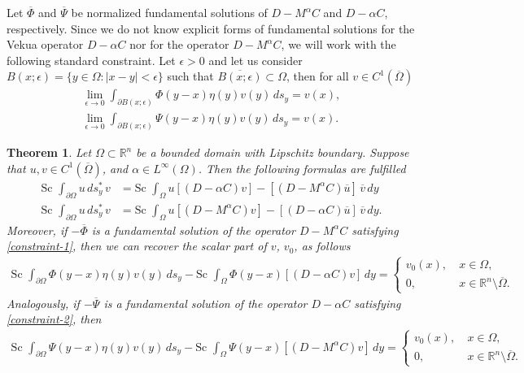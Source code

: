 \documentclass[12pt]{article}
\newtheorem{theorem}{Theorem}
\def\R{\mathbb{R}}
\def\Sc{\mbox{Sc}\,}
\begin{document}
Let $\overline{\Phi}$ and $\overline{\Psi}$ be normalized fundamental solutions of $D-M^{\alpha}C$ and $D-\alpha C$, respectively. Since we do not know explicit forms of fundamental solutions for the Vekua operator $D-\alpha C$ nor for the operator $D-M^{\alpha}C$, we will work with the following standard constraint. Let $\epsilon>0$ and let us consider $B(x;\epsilon)=\{y\in \Omega \colon  |x-y|<\epsilon\}$ such that $\overline{B(x;\epsilon)}\subset \Omega$, then for all $v\in C^1(\overline{\Omega})$
\begin{align}\label{constraint-1}
   \lim_{\epsilon\rightarrow 0} \int_{\partial B(x;\epsilon)} \Phi(y-x)\eta(y)v(y)\, ds_y=v(x),\\
   \lim_{\epsilon\rightarrow 0} \int_{\partial B(x;\epsilon)} \Psi(y-x)\eta(y)v(y)\, ds_y=v(x).\label{constraint-2}
\end{align}
\begin{theorem}\label{th:Cauchy-theorem}
 Let $\Omega\subset \mathbb{R}^n$ be a bounded domain with Lipschitz boundary. Suppose that $ u, v\in C^1(\overline{\Omega})$, and $\alpha\in L^{\infty}(\Omega)$. Then the following formulas are fulfilled
\begin{align}
   \text{Sc }\int_{\partial\Omega} u\, ds_y^* \, v&=\text{Sc }\int_{\Omega} u [ (D-\alpha C)v]-
   [(D-M^{\alpha}C)\overline{u}]\, \overline{v} \, dy\label{eq:integral-formula-1}\\
   \text{Sc }\int_{\partial\Omega} u\, ds_y^* \, v&=\text{Sc }\int_{\Omega} u [(D-M^{\alpha}C)v]-
   [(D-\alpha C)\overline{u}]\, \overline{v}\, dy.\label{eq:integral-formula-2}
\end{align}
Moreover, if $-\overline{\Phi}$ is a fundamental solution of the operator $D-M^{\alpha}C$ satisfying \eqref{constraint-1}, then we can recover the scalar part of $v$, $v_0$, as follows
\begin{align}\label{eq:scalar-BP}
\Sc\, \int_{\partial\Omega}\Phi(y-x) \eta(y) v(y)\, ds_{y}-\Sc\, \int_{\Omega} \Phi(y-x) [ (D-\alpha C)v] \, dy=\left\{
   \begin{array}{ll}
      v_0(x), \ & x\in \Omega,\\
      0,           & x\in \R^n\setminus \overline{\Omega}.
   \end{array}
\right. 
\end{align}
Analogously,  if $-\overline{\Psi}$ is a fundamental solution of the operator $D-\alpha C$ satisfying \eqref{constraint-2}, then 
\begin{align}\label{eq:scalar-BP-2}
  \Sc\, \int_{\partial\Omega}\Psi(y-x) \eta(y) v(y)\, ds_{y}-\Sc\, \int_{\Omega} \Psi(y-x) [ (D-M^{\alpha} C)v] \, dy=\left\{
   \begin{array}{ll}
      v_0(x), \ & x\in \Omega,\\
      0,           & x\in \R^n\setminus \overline{\Omega}.
   \end{array}
\right. 
\end{align}
\end{theorem}
\end{document}
